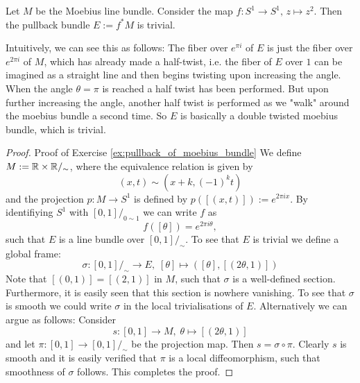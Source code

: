 \begin{exercise}
    \label{ex:pullback_of_moebius_bundle}
    Let $M$ be the Moebius line bundle. Consider the map $f \colon S^1 \to S^1, \, z \mapsto z^2$. Then the pullback bundle $E := f^*M$ is trivial. 
\end{exercise}
Intuitively, we can see this as follows: The fiber over $e^{\pi i}$ of $E$ is just the fiber over $e^{2 \pi i}$ of $M$, which has already made a half-twist, i.e. the fiber of $E$ over $1$ can be imagined as a straight line and then begins twisting upon increasing the angle. When the angle $\theta = \pi$ is reached a half twist has been performed. But upon further increasing the angle, another half twist is performed as we "walk" around the moebius bundle a second time. So $E$ is basically a double twisted moebius bundle, which is trivial.

\begin{proof}{Proof of Exercise \ref{ex:pullback_of_moebius_bundle}}
    We define $M := \mathbb{R} \times \mathbb{R}/_\sim $, where the equivalence relation is given by 
    \[
    (x,t) \sim (x + k, (-1)^kt)
    \]
    and the projection $p \colon M \to S^1$ is defined by $p([(x,t)]) := e^{2 \pi i x}$.
    By identifiying $S^1$ with $[0,1]/_{0 \sim 1}$ we can write $f$ as
    \[
    f([\theta]) = e^{2\pi i \theta},
    \]
    such that $E$ is a line bundle over $[0,1]/_\sim$. To see that $E$ is trivial we define a global frame:
    \[
    \sigma \colon [0,1]/_\sim \to E, \; [\theta] \mapsto ([\theta],[(2\theta,1)])
    \]
    Note that $[(0,1)] = [(2,1)]$ in $M$, such that $\sigma$ is a well-defined section. Furthermore, it is easily seen that this section is nowhere vanishing. To see that $\sigma$ is smooth we could write $\sigma$ in the local trivialisations of $E$. Alternatively we can argue as follows: Consider $$s \colon [0,1] \to M, \; \theta \mapsto [(2\theta,1)]$$ and let $\pi \colon [0,1] \to [0,1]/_\sim$ be the projection map. Then $s = \sigma \circ \pi$. Clearly $s$ is smooth and it is easily verified that $\pi$ is a local diffeomorphism, such that smoothness of $\sigma$ follows. This completes the proof. 
\end{proof}

